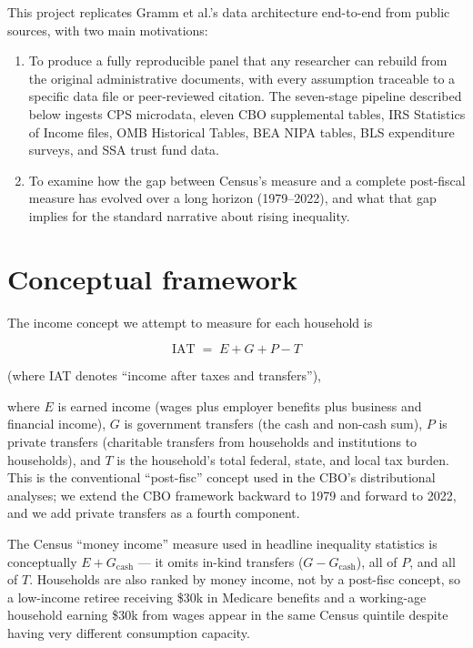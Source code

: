 \documentclass[11pt,letterpaper]{article}
\begin{document}
This project replicates Gramm et al.'s data architecture end-to-end from
public sources, with two main motivations:

\begin{enumerate}[leftmargin=*]
  \item To produce a fully reproducible panel that any researcher can rebuild
        from the original administrative documents, with every assumption
        traceable to a specific data file or peer-reviewed citation. The
        seven-stage pipeline described below ingests CPS microdata, eleven
        CBO supplemental tables, IRS Statistics of Income files, OMB
        Historical Tables, BEA NIPA tables, BLS expenditure surveys, and SSA
        trust fund data.
  \item To examine how the gap between Census's measure and a complete
        post-fiscal measure has evolved over a long horizon (1979--2022), and
        what that gap implies for the standard narrative about rising
        inequality.
\end{enumerate}

\section{Conceptual framework}

The income concept we attempt to measure for each household is

\begin{equation}
\text{IAT} \;=\; E + G + P - T
\end{equation}

\noindent (where IAT denotes ``income after taxes and transfers''),

\noindent where $E$ is earned income (wages plus employer benefits plus business and
financial income), $G$ is government transfers (the cash and non-cash sum), $P$
is private transfers (charitable transfers from households and institutions to
households), and $T$ is the household's total federal, state, and local tax
burden. This is the conventional ``post-fisc'' concept used in the CBO's
distributional analyses; we extend the CBO framework backward to 1979 and
forward to 2022, and we add private transfers as a fourth component.

The Census ``money income'' measure used in headline inequality statistics
is conceptually $E + G_{\text{cash}}$ --- it omits in-kind transfers
($G - G_{\text{cash}}$), all of $P$, and all of $T$. Households are also
ranked by money income, not by a post-fisc concept, so a low-income retiree
receiving \$30k in Medicare benefits and a working-age household earning
\$30k from wages appear in the same Census quintile despite having very
different consumption capacity.
\end{document}

